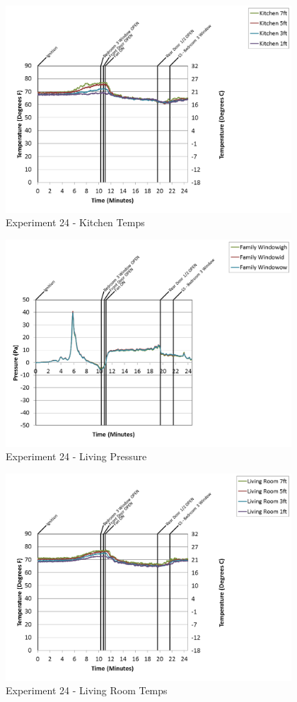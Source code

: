 \documentclass{article}
\begin{document}
\begin{appendices}
\begin{figure}[h!]
	\centering
	\includegraphics[height=3.05in]{0_Images/Results_Charts/Exp_24_Charts/KitchenTemps.png}
	\caption{Experiment 24 - Kitchen Temps}
\end{figure}

\clearpage

\begin{figure}[h!]
	\centering
	\includegraphics[height=3.05in]{0_Images/Results_Charts/Exp_24_Charts/LivingPressure.png}
	\caption{Experiment 24 - Living Pressure}
\end{figure}


\begin{figure}[h!]
	\centering
	\includegraphics[height=3.05in]{0_Images/Results_Charts/Exp_24_Charts/LivingRoomTemps.png}
	\caption{Experiment 24 - Living Room Temps}
\end{figure}


\end{appendices}
\end{document}
